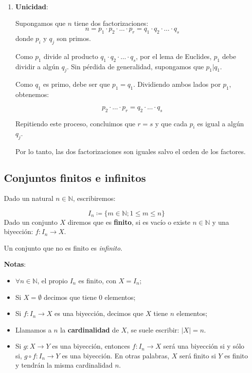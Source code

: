 \begin{fmd-proof}
\begin{enumerate}
\begin{itemize}
		Lo que demuestra la existencia de la factorización para $n$.
	\end{itemize}
	
	\item \textbf{Unicidad}:
	
	Supongamos que $n$ tiene dos factorizaciones:
	\[n = p_1 \cdot p_2 \cdot \ldots \cdot p_r = q_1 \cdot q_2 \cdot \ldots \cdot q_s\]
	donde $p_i$ y $q_j$ son primos.
	
	Como $p_1$ divide al producto $q_1 \cdot q_2 \cdot \ldots \cdot q_s$, por el lema de Euclides, $p_1$ debe dividir a algún $q_j$. Sin pérdida de generalidad, supongamos que $p_1 | q_1$.
	
	Como $q_1$ es primo, debe ser que $p_1 = q_1$. Dividiendo ambos lados por $p_1$, obtenemos:
	
	\[p_2 \cdot \ldots \cdot p_r = q_2 \cdot \ldots \cdot q_s\]
	
	Repitiendo este proceso, concluimos que $r = s$ y que cada $p_i$ es igual a algún $q_j$.
	
	Por lo tanto, las dos factorizaciones son iguales salvo el orden de los factores.
\end{enumerate}
\end{fmd-proof}


\subsection{Conjuntos finitos e infinitos} \label{sec:finitos}  
\vspace{1em}
\begin{fmd-definition}
	Dado un natural $n \in \mathbb{N}$, escribiremos:
	
	\[ I_n \coloneqq \{ m \in \mathbb{N}; 1 \le m \le n\} \]
	Dado un conjunto $X$ diremos que es \textbf{finito}, si es vacío o existe $n \in \mathbb{N}$ y una biyección: $f: I_n \rightarrow X$.
	
	Un conjunto que no es finito es \textit{infinito}.
\end{fmd-definition}

\textbf{Notas}:
\begin{itemize}
	\item $\forall n \in \mathbb{N} $, el propio $I_n$ es finito, con $X = I_n$;
	\item Si $X = \emptyset$ decimos que tiene 0 elementos;
	\item Si $f: I_n \rightarrow X$ es una biyección, decimos que $X$ tiene $n$ elementos;
	\item Llamamos a $n$ la \textbf{cardinalidad} de $X$, se suele escribir: $|X| = n$.
	\item Si $g: X \rightarrow Y$ es una biyección, entonces $f:I_n \rightarrow X$ será una biyección si y sólo si, $g \circ f:I_n \rightarrow Y$ es una biyección. En otras palabras, $X$ será finito si $Y$ es finito y tendrán la misma cardinalidad $n$.
\end{itemize}

